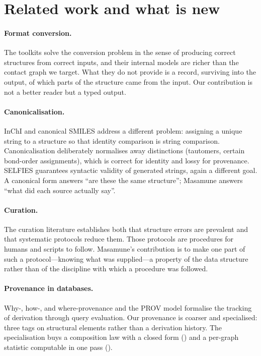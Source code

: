 \documentclass[11pt,twocolumn,a4paper]{article}
\theoremstyle{msthm}
\theoremstyle{definition}
\theoremstyle{remark}
\begin{document}
\section{Related work and what is new}
\label{sec:related}

\paragraph{Format conversion.} The toolkits
\citep{rdkit,oboyle2011openbabel,willighagen2017cdk} solve the
conversion problem in the sense of producing correct structures from
correct inputs, and their internal models are richer than the contact
graph we target. What they do not provide is a record, surviving into
the output, of which parts of the structure came from the input. Our
contribution is not a better reader but a typed output.

\paragraph{Canonicalisation.} InChI \citep{heller2015inchi} and
canonical SMILES \citep{weininger1989smiles2,oboyle2012inchi} address a
different problem: assigning a unique string to a structure so that
identity comparison is string comparison. Canonicalisation deliberately
normalises away distinctions (tautomers, certain bond-order
assignments), which is correct for identity and lossy for provenance.
SELFIES \citep{krenn2020selfies} guarantees syntactic validity of
generated strings, again a different goal. A canonical form answers
``are these the same structure''; Masamune answers ``what did each
source actually say''.

\paragraph{Curation.} The curation literature
\citep{fourches2010curation,fourches2016curation2,williams2012quality,%
young2008errors} establishes both that structure errors are prevalent
and that systematic protocols reduce them. Those protocols are
procedures for humans and scripts to follow. Masamune's contribution is
to make one part of such a protocol---knowing what was supplied---a
property of the data structure rather than of the discipline with which
a procedure was followed.

\paragraph{Provenance in databases.} Why-, how-, and where-provenance
\citep{buneman2001why,cheney2009provenance} and the PROV model
\citep{moreau2013prov} formalise the tracking of derivation through
query evaluation. Our provenance is coarser and specialised: three tags
on structural elements rather than a derivation history. The
specialisation buys a composition law with a closed form
() and a per-graph statistic computable in one
pass ().
\end{document}
